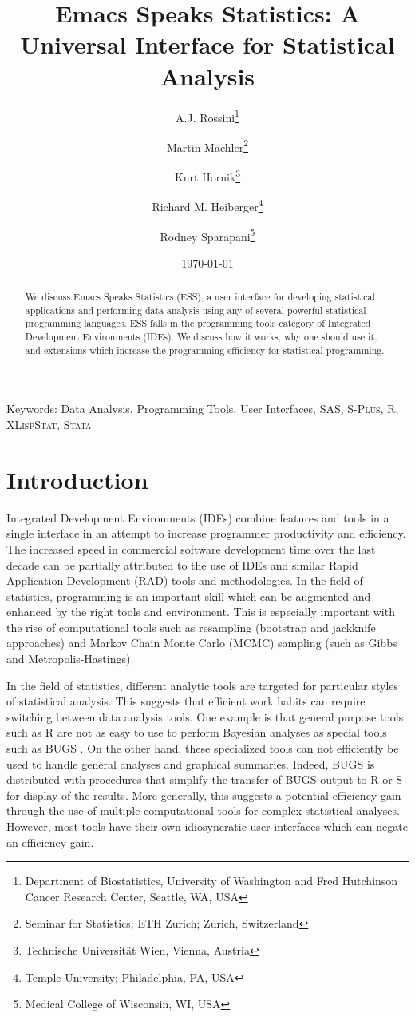 \documentclass{article}
\title{Emacs Speaks Statistics: A Universal Interface for
  Statistical Analysis}
\author{A.J. Rossini\footnote{Department of Biostatistics, University
    of Washington and Fred Hutchinson Cancer Research Center, Seattle,
    WA, USA} \and Martin M{\"a}chler\footnote{Seminar for Statistics;
    ETH Zurich; Zurich, Switzerland} \and Kurt
  Hornik\footnote{Technische Universit{\"a}t Wien, Vienna, Austria}
  \and Richard M. Heiberger\footnote{Temple University; Philadelphia,
    PA, USA} \and Rodney Sparapani\footnote{Medical College of
    Wisconsin, WI, USA}}
\date{\today}
\newif\ifpdf
\newcommand*{\Splus}{\textsc{S-Plus}}
\newcommand*{\XLispStat}{\textsc{XLispStat}}
\newcommand*{\Stata}{\textsc{Stata}}
\begin{document}
\ifpdf
  \DeclareGraphicsExtensions{.jpg,.pdf,.png,.mps}
\fi


\maketitle

Keywords: Data Analysis, Programming Tools, User Interfaces, SAS,
\Splus, R, \XLispStat, \Stata

\begin{abstract}
  We discuss Emacs Speaks Statistics (ESS), a user interface for
  developing statistical applications and performing data analysis
using any of several powerful statistical programming languages.  ESS falls in
  the programming tools category of Integrated Development
  Environments (IDEs).  We discuss how it works, why one should use
  it, and extensions which increase the programming efficiency for
  statistical programming.
\end{abstract}

\section{Introduction}
\label{sec:intro}

Integrated Development Environments (IDEs) combine features and tools
in a single interface in an attempt to increase programmer
productivity and efficiency.  The increased speed in commercial
software development time over the last decade can be partially
attributed to the use of IDEs and similar Rapid Application
Development (RAD) tools and methodologies.  In the field of
statistics, programming is an important skill which can be augmented
and enhanced by the right tools and environment.  This is especially
important with the rise of computational tools such as resampling
(bootstrap and jackknife approaches) and Markov Chain Monte Carlo
(MCMC) sampling (such as Gibbs and Metropolis-Hastings).

In the field of statistics, different analytic tools are targeted for
particular styles of statistical analysis.  This suggests that
efficient work habits can require switching between data analysis
tools.  One example is that general purpose tools such as R
\citep{ihak:gent:1996} are not as easy to use to perform Bayesian
analyses as special tools such as BUGS \citep{SpieThomBest:1999}.  On
the other hand, these specialized tools can not efficiently be used to
handle general analyses and graphical summaries.  Indeed, BUGS is distributed
with procedures that simplify the transfer of BUGS output
to R or S for display of the results.  More generally, this suggests a
potential efficiency gain through the use of multiple
computational tools for complex statistical analyses.  However, most
tools have their own idiosyncratic user interfaces which can
negate an efficiency gain.
\end{document}
